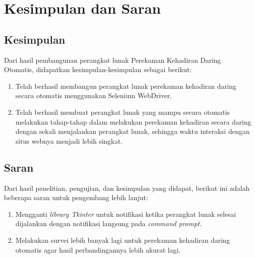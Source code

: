 \chapter{Kesimpulan dan Saran}
\label{chap:simpulandansaran}

\section{Kesimpulan}
\label{sec:kesimpulan} 
Dari hasil pembangunan perangkat lunak Perekaman Kehadiran Daring Otomatis, didapatkan kesimpulan-kesimpulan sebagai berikut:
\begin{enumerate}
	\item Telah berhasil membangun perangkat lunak perekaman kehadiran daring secara otomatis menggunakan Selenium WebDriver.
	\item Telah berhasil membuat perangkat lunak yang mampu secara otomatis melakukan tahap-tahap dalam melakukan perekaman kehadiran secara daring dengan sekali menjalankan perangkat lunak, sehingga waktu interaksi dengan situs webnya menjadi lebih singkat. 
\end{enumerate}

\section{Saran}
\label{sec:saran} 
Dari hasil penelitian, pengujian, dan kesimpulan yang didapat, berikut ini adalah  beberapa saran untuk pengembang lebih lanjut:
\begin{enumerate}
	\item Mengganti \textit{library Tkinter} untuk notifikasi ketika perangkat lunak selesai dijalankan dengan notifikasi langsung pada \textit{command prompt}.
	\item Melakukan survei lebih banyak lagi untuk perekaman kehadiran daring otomatis agar hasil perbandingannya lebih akurat lagi.
\end{enumerate}

